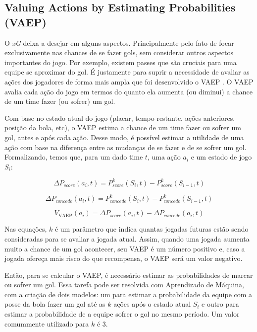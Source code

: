 \documentclass{article}
\begin{document}
\subsection{Valuing Actions by Estimating Probabilities (VAEP)}

O \textit{xG} deixa a desejar em alguns aspectos. Principalmente pelo fato de
focar exclusivamente nas chances de se fazer gols, sem considerar outros
aspectos importantes do jogo. Por exemplo, existem passes que são cruciais para
uma equipe se aproximar do gol. É justamente para suprir a necessidade de
avaliar as ações dos jogadores de forma mais ampla que foi desenvolvido o VAEP
\cite{vaep}. O VAEP avalia cada ação do jogo em termos do quanto ela aumenta (ou
diminui) a chance de um time fazer (ou sofrer) um gol.

Com base no estado atual do jogo (placar, tempo restante, ações anteriores,
posição da bola, etc), o VAEP estima a chance de um time fazer ou sofrer um gol,
antes e após cada ação. Desse modo, é possível estimar a utilidade de uma ação
com base na diferença entre as mudanças de se fazer e de se sofrer um gol.
Formalizando, temos que, para um dado time $t$, uma ação $a_i$ e um estado de
jogo $S_i$:

\begin{equation}
	\Delta P_{score}(a_i,t) = P^k_{score}(S_i,t) - P^k_{score}(S_{i-1},t)
	\label{eq:vaep_scores}
\end{equation}

\begin{equation}
	\Delta P_{concede}(a_i,t) = P^k_{concede}(S_i,t) - P^k_{concede}(S_{i-1},t)
	\label{eq:vaep_concedes}
\end{equation}

\begin{equation}
	V_{\textrm{VAEP}}(a_i) = \Delta P_{score}(a_i,t) - \Delta P_{concede}(a_i,t) 
	\label{eq:vaep}
\end{equation}

Nas equações, $k$ é um parâmetro que indica quantas jogadas futuras estão sendo
consideradas para se avaliar a jogada atual. Assim, quando uma jogada aumenta
muito a chance de um gol acontecer, seu VAEP é um número positivo e, caso a
jogada ofereça mais risco do que recompensa, o VAEP será um valor negativo.

Então, para se calcular o VAEP, é necessário estimar as probabilidades de marcar
ou sofrer um gol. Essa tarefa pode ser resolvida com Aprendizado de Máquina, com
a criação de dois modelos: um para estimar a probabilidade da equipe com a posse
da bola fazer um gol até as $k$ ações após o estado atual $S_i$ e outro para
estimar a probabilidade de a equipe sofrer o gol no mesmo período. Um valor
comummente utilizado para $k$ é 3.
\end{document}
